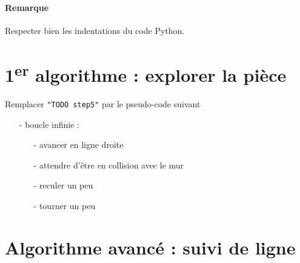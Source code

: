 \documentclass{report}
\begin{document}
\paragraph{Remarque}
Respecter bien les indentations du code Python.

\section{1\textsuperscript{er} algorithme : explorer la pièce}

\begin{itemize}
\step Remplacer \texttt{"TODO step5"} par le pseudo-code suivant
\begin{itemize}
    \item[-] boucle infinie :
    \begin{itemize}
        \item[-] avancer en ligne droite
        \item[-] attendre d'être en collision avec le mur
        \item[-] reculer un peu
        \item[-] tourner un peu
    \end{itemize}
\end{itemize}
\end{itemize}

\section{Algorithme avancé : suivi de ligne}
\end{document}
